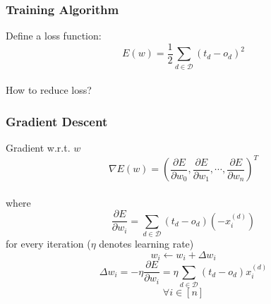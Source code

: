 \documentclass{beamer}
\begin{document}
\begin{frame}
\frametitle{Training Algorithm}
Define a loss function:\\
\begin{equation*}
E(w)=\frac{1}{2}\sum_{d\in\mathcal{D}}(t_{d}-o_{d})^{2}
\end{equation*}\\
How to reduce loss?\\
\end{frame}

\begin{frame}
\frametitle{Gradient Descent}
Gradient w.r.t. $w$\\
\begin{equation*}
\nabla E(w)=(\frac{\partial E}{\partial w_{0}},\frac{\partial E}{\partial w_{1}},\cdots,\frac{\partial E}{\partial w_{n}})^{T}
\end{equation*}\\
where\\
\begin{equation*}
\frac{\partial E}{\partial w_{i}}=\sum_{d\in\mathcal{D}}(t_{d}-o_{d})(-x_{i}^{(d)})
\end{equation*}
for every iteration ($\eta$ denotes learning rate)\\
\begin{equation*}
w_{i}\gets w_{i}+\Delta w_{i}
\end{equation*}
\begin{equation*}
\Delta w_{i}=-\eta\frac{\partial E}{\partial w_{i}}=\eta\sum_{d\in\mathcal{D}}(t_{d}-o_{d})x_{i}^{(d)}
\end{equation*}
\begin{equation*}
\forall i\in[n]
\end{equation*}
\end{frame}
\end{document}
